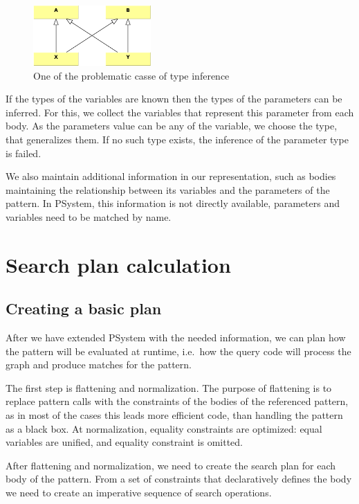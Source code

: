\begin{figure}[h]
	\begin{center}
		\includegraphics[width=0.4\textwidth]{figures/multiple-inheritance-problem.pdf}
		\caption{One of the problematic casse of type inference}
		\label{fig:multiple-inheritance-problem}
	\end{center}
\end{figure}

If the types of the variables are known then the types of the parameters can be inferred. 
For this, we collect the variables that represent this parameter from each body.
As the parameters value can be any of the variable, we choose the type, that generalizes them.
If no such type exists, the inference of the parameter type is failed.

We also maintain additional information in our representation, such as bodies maintaining the relationship between its variables and the parameters of the pattern. 
In PSystem, this information is not directly available, parameters and variables need to be matched by name.

\section{Search plan calculation}

\subsection{Creating a basic plan}
After we have extended PSystem with the needed information, we can plan how the pattern will be evaluated at runtime, i.e.\ how the query code will process the graph and produce matches for the pattern.

The first step is flattening and normalization. 
The purpose of flattening is to replace pattern calls with the constraints of the bodies of the referenced pattern, as in most of the cases this leads more efficient code, than handling the pattern as a black box.
At normalization, equality constraints are optimized: equal variables are unified, and equality constraint is omitted.

After flattening and normalization, we need to create the search plan for each body of the pattern. From a set of constraints that declaratively defines the body we need to create an imperative sequence of search operations.

